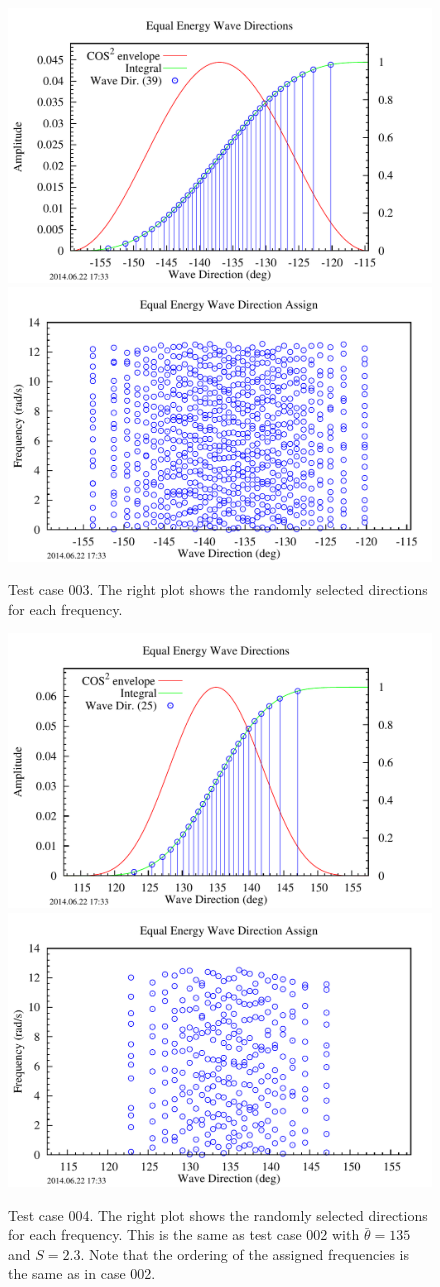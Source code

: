 \begin{figure}
   \centering
   \includegraphics[width=.47\linewidth]{chaps/figures/WaveDirTest/WavesTest_003--equal_energy_disc.pdf}
   \includegraphics[width=.47\linewidth]{chaps/figures/WaveDirTest/WavesTest_003--wavedir_assign.pdf}
   \caption{Test case 003.  The right plot shows the randomly selected directions for each frequency.\label{fig:MultiDir:WavesTest003}}
\end{figure}

\begin{figure}
   \centering
   \includegraphics[width=.47\linewidth]{chaps/figures/WaveDirTest/WavesTest_004--equal_energy_disc.pdf}
   \includegraphics[width=.47\linewidth]{chaps/figures/WaveDirTest/WavesTest_004--wavedir_assign.pdf}
   \caption{Test case 004.  The right plot shows the randomly selected directions for each frequency.  This is the same as test case 002 with $\bar\theta=135$ and $S=2.3$.  Note that the ordering of the assigned frequencies is the same as in case 002.\label{fig:MultiDir:WavesTest004}}
\end{figure}

